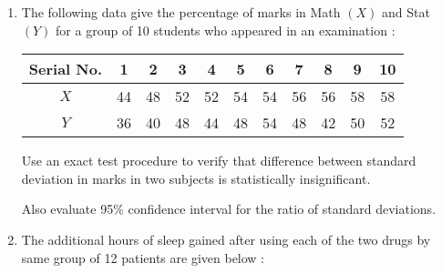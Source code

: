\documentclass[11pt, a4paper]{article}
\begin{document}
\begin{enumerate}

\item The following data give the percentage of marks in Math $(X)$ and Stat $(Y)$ for a group of 10 students who appeared in an examination :

	\begin{table}[h]
	\def\arraystretch{1.5}
	
	\begin{center}
	\begin{tabular}{|c||cccccccccc|}
	
	\hline
	
	Serial No. & 1 & 2 & 3 & 4 & 5 & 6 & 7 & 8 & 9 & 10 \\
	
	\hline
	
	$X$ & 44 & 48 & 52 & 52 & 54 & 54 & 56 & 56 & 58 & 58 \\
	
	\hline
	
	$Y$ & 36 & 40 & 48 & 44 & 48 & 54 & 48 & 42 & 50 & 52 \\
	
	\hline
	
	
	
	\end{tabular}
	\end{center}
	
	\end{table}
	
	Use an exact test procedure to verify that difference between standard deviation in marks in two subjects is statistically insignificant. 
	
	\setlength{\parindent}{45pt} Also evaluate 95\% confidence interval for the ratio of standard deviations.
	
	
	
	
	
	
	
	
	
	
	
	
	
	
	
	
	
	
\item The additional hours of sleep gained after using each of the two drugs by same group of 12 patients are given below :

	\begin{table}[h]
	\def\arraystretch{1.19}
	
	\begin{center}
	\begin{tabular}{|c|>{\centering}m{2cm}|>{\centering\arraybackslash}m{2cm}|}
	

\end{tabular}
\end{center}
\end{table}
\end{enumerate}
\end{document}
